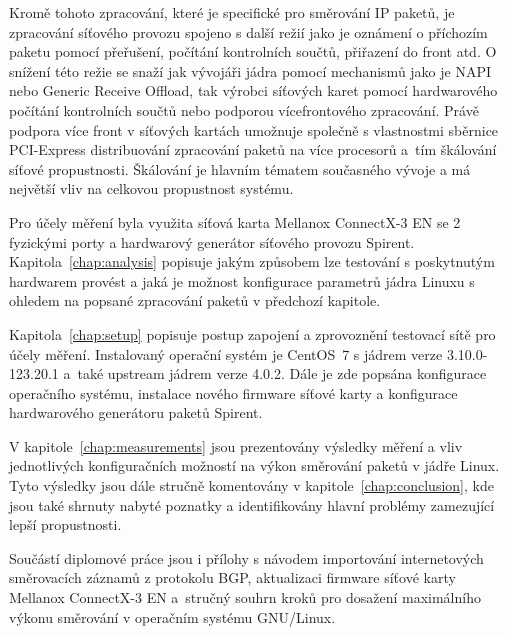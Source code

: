 \documentclass[english,print]{fitthesis} %
\begin{document}
Kromě tohoto zpracování, které je specifické pro směrování IP paketů, je zpracování síťového provozu
spojeno s další režií jako je oznámení o příchozím paketu pomocí přeřušení,
počítání kontrolních součtů, přiřazení do front atd.
O snížení této režie se snaží jak vývojáři jádra pomocí mechanismů jako je NAPI nebo Generic Receive Offload,
tak výrobci síťových karet pomocí hardwarového počítání kontrolních součtů nebo podporou vícefrontového zpracování.
Právě podpora více front v síťových kartách umožnuje společně s vlastnostmi sběrnice PCI-Express
distribuování zpracování paketů na více procesorů a~tím škálování síťové propustnosti.
Škálování je hlavním tématem současného vývoje a má největší vliv na celkovou propustnost systému.

Pro účely měření byla využita síťová karta Mellanox ConnectX-3 EN se 2 fyzickými porty
a hardwarový generátor síťového provozu Spirent.
Kapitola~\ref{chap:analysis} popisuje jakým způsobem lze testování s poskytnutým hardwarem provést
a jaká je možnost konfigurace parametrů jádra Linuxu s ohledem na popsané zpracování paketů v předchozí kapitole.

Kapitola~\ref{chap:setup} popisuje postup zapojení a zprovoznění testovací sítě pro účely měření.
Instalovaný operační systém je CentOS~7 s jádrem verze 3.10.0-123.20.1 a~také upstream jádrem verze 4.0.2.
Dále je zde popsána konfigurace operačního systému, instalace nového firmware síťové karty a konfigurace hardwarového generátoru
paketů Spirent.

V kapitole~\ref{chap:measurements} jsou prezentovány výsledky měření a vliv jednotlivých konfiguračních možností
na výkon směrování paketů v jádře Linux.
Tyto výsledky jsou dále stručně komentovány v kapitole~\ref{chap:conclusion}, kde jsou také shrnuty nabyté poznatky
a identifikovány hlavní problémy zamezující lepší propustnosti.

Součástí diplomové práce jsou i přílohy s návodem importování internetových směrovacích záznamů z protokolu BGP,
aktualizaci firmware síťové karty Mellanox ConnectX-3 EN
a~stručný souhrn kroků pro dosažení maximálního výkonu směrování v operačním systému GNU/Linux.

  \setcounter{tocdepth}{1}
  \tableofcontents
  


\ifczech
  
\else 
  
%  
\fi
  \begin{flushleft}
  \end{flushleft}
  \appendix
  
\end{document}
